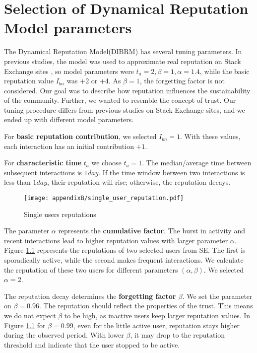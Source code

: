 \chapter{Selection of Dynamical Reputation Model parameters}
\label{App:parameters}

The Dynamical Reputation Model(DIBRM) has several tuning parameters. In previous studies, the model \cite{melnikov2018toward,yashkina2020} was used to approximate real reputation on Stack Exchange sites \cite{yashkina2020}, so model parameters were $t_a =2, \beta = 1, \alpha = 1.4$, while the basic reputation value $I_{bn}$ was +2 or +4. As $\beta=1$, the forgetting factor is not considered. Our goal was to describe how reputation influences the sustainability of the community. Further, we wanted to resemble the concept of trust. Our tuning procedure differs from previous studies on Stack Exchange sites, and we ended up with different model parameters. 

For \textbf{basic reputation contribution}, we selected $I_{bn}=1$. With these values, each interaction has an initial contribution $+1$. 

For \textbf{characteristic time} $t_a$ we choose $t_a=1$. The median/average time between subsequent interactions is $1 day$. If the time window between two interactions is less than $1 day$, their reputation will rise; otherwise, the reputation decays.

\begin{figure}[h]
	\centering
	\texttt{[image: appendixB/single\_user\_reputation.pdf]}
	\caption[Single users reputations.]{Single users reputations }
	\label{fig:singleuser}
\end{figure} 

The {parameter $\alpha$} represents the \textbf{cumulative factor}. The burst in activity and recent interactions lead to higher reputation values with larger parameter $\alpha$. Figure \ref{fig:singleuser} represents the reputations of two selected users from SE. The first is sporadically active, while the second makes frequent interactions. We calculate the reputation of these two users for different parameters $(\alpha, \beta)$. We selected $\alpha=2$.  

The reputation decay determines the \textbf{forgetting factor $\beta$}. We set the parameter on $\beta=0.96$. The reputation should reflect the properties of the trust. This means we do not expect $\beta$ to be high, as inactive users keep larger reputation values. In Figure \ref{fig:singleuser} for $\beta=0.99$, even for the little active user, reputation stays higher during the observed period. With lower $\beta$, it may drop to the reputation threshold and indicate that the user stopped to be active.  

